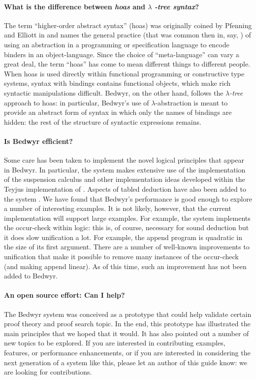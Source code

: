 \paragraph{What is the difference between {\em hoas} and $\lambda${\em
    -tree syntax}?}
The term ``higher-order abstract syntax'' (hoas) was originally coined
by Pfenning and Elliott in \cite{pfenning88pldi} and names the general
practice (that was common then in, say, \lp{}
\cite{miller87slp}) of using an abstraction in a programming or
specification language to encode binders in an object-language.  Since
the choice of ``meta-language'' can vary a great deal, the term
``hoas'' has come to mean different things to different people.  When
hoas is used directly within functional programming or constructive
type systems, syntax with bindings contains functional objects, which
make rich syntactic manipulations difficult.  Bedwyr, on the other
hand, follows the {\em $\lambda$-tree} approach \cite{miller00cl} to
hoas: in particular, Bedwyr's use of $\lambda$-abstraction is meant to
provide an abstract form of syntax in which only the names of bindings
are hidden: the rest of the structure of syntactic expressions
remains.

\paragraph{Is Bedwyr efficient?}
Some care has been taken to implement the novel logical principles
that appear in Bedwyr.  In particular, the system makes extensive use
of the implementation of the suspension calculus \cite{nadathur99jflp}
and other implementation ideas developed within the Teyjus
\cite{nadathur99cade} implementation of \lp{} \cite{nadathur88iclp}.
Aspects of tabled deduction have also been added to the system
\cite{ramakrishna97cav,pientka05cade}.  We have found that Bedwyr's
performance is good enough to explore a number of interesting
examples.  It is not likely, however, that the current implementation
will support large examples.  For example, the system implements the
occur-check within logic: this is, of course, necessary for sound
deduction but it does slow unification a lot.  For example, the append
program is quadratic in the size of its first argument.  There are a
number of well-known improvements to unification that make it possible
to remove many instances of the occur-check (and making append
linear).  As of this time, such an improvement has not been added to
Bedwyr.

\paragraph{An open source effort: Can I help?}
The Bedwyr system was conceived as a prototype that could help
validate certain proof theory and proof search topic.  In the end,
this prototype has illustrated the main principles that we hoped that
it would.  It has also pointed out a number of new topics to be
explored.  If you are interested in contributing examples, features,
or performance enhancements, or if you are interested in considering
the next generation of a system like this, please let an author of
this guide know: we are looking for contributions.

